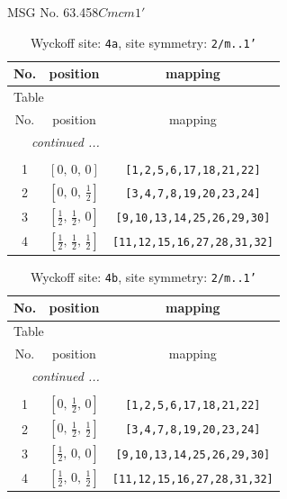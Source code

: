 \documentclass[fleqn,8pt]{jsarticle}
\begin{document}
\setcounter{MaxMatrixCols}{32}

\renewcommand{\tablename}{Table~}
\renewcommand{\figurename}{Figure~}
\begin{center}
\LARGE
MSG No. 63.458\quad$Cmcm1'$
\end{center}
\renewcommand{\arraystretch}{1.2}
\begin{longtable}{ccc}
\caption{Wyckoff site: {\tt 4a}, site symmetry: {\tt 2/m..1'}}
 \\
 \hline \hline
No. & position & mapping \\ \hline \endfirsthead

\multicolumn{2}{l}{\tablename\ \thetable{}} \\
 \hline \hline
No. & position & mapping \\ \hline \endhead

 \hline \hline
\multicolumn{2}{r}{\footnotesize\it continued ...} \\ \endfoot

 \hline \hline
\multicolumn{2}{r}{} \\ \endlastfoot

1 & $\left[ 0,\, 0,\, 0 \right]$ & {\tt [1,2,5,6,17,18,21,22]} \\ \hline
2 & $\left[ 0,\, 0,\, \frac{1}{2} \right]$ & {\tt [3,4,7,8,19,20,23,24]} \\ \hline
3 & $\left[ \frac{1}{2},\, \frac{1}{2},\, 0 \right]$ & {\tt [9,10,13,14,25,26,29,30]} \\ \hline
4 & $\left[ \frac{1}{2},\, \frac{1}{2},\, \frac{1}{2} \right]$ & {\tt [11,12,15,16,27,28,31,32]} \\
\end{longtable}
\renewcommand{\arraystretch}{1.2}
\begin{longtable}{ccc}
\caption{Wyckoff site: {\tt 4b}, site symmetry: {\tt 2/m..1'}}
 \\
 \hline \hline
No. & position & mapping \\ \hline \endfirsthead

\multicolumn{2}{l}{\tablename\ \thetable{}} \\
 \hline \hline
No. & position & mapping \\ \hline \endhead

 \hline \hline
\multicolumn{2}{r}{\footnotesize\it continued ...} \\ \endfoot

 \hline \hline
\multicolumn{2}{r}{} \\ \endlastfoot

1 & $\left[ 0,\, \frac{1}{2},\, 0 \right]$ & {\tt [1,2,5,6,17,18,21,22]} \\ \hline
2 & $\left[ 0,\, \frac{1}{2},\, \frac{1}{2} \right]$ & {\tt [3,4,7,8,19,20,23,24]} \\ \hline
3 & $\left[ \frac{1}{2},\, 0,\, 0 \right]$ & {\tt [9,10,13,14,25,26,29,30]} \\ \hline
4 & $\left[ \frac{1}{2},\, 0,\, \frac{1}{2} \right]$ & {\tt [11,12,15,16,27,28,31,32]} \\
\end{longtable}
\end{document}
